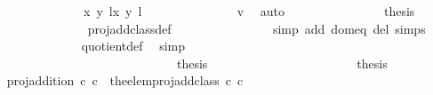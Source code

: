 \begin{isabellebody}
\ \ \ \ \ \ \ \ \ \ \ \ \ \ \ \ {\isacharbraceleft}{\isacharparenleft}{\isacharparenleft}{\isacharparenleft}x{\isacharcomma}\ y{\isacharparenright}{\isacharcomma}\ l{\isacharparenright}{\isacharcomma}{\isacharparenleft}{\isacharparenleft}x{\isacharprime}{\isacharcomma}\ y{\isacharprime}{\isacharparenright}{\isacharcomma}\ l{\isacharprime}{\isacharparenright}{\isacharparenright}{\isacharbraceright}{\isachardoublequoteclose}\ \isanewline
\ \ \ \ \ \ \ \ \ \ \ \ \isamarkupfalse%
\ v{}\ \isamarkupfalse%
\ auto\isanewline
\ \ \ \ \ \ \ \ \ \ \ \ \isamarkupfalse%
\ \isamarkupfalse%
\ {\isacharquery}thesis\ \isanewline
\ \ \ \ \ \ \ \ \ \ \ \ \ \ \isamarkupfalse%
\ {}\ proj{\isacharunderscore}add{\isacharunderscore}class{\isacharunderscore}def\ \isanewline
\ \ \ \ \ \ \ \ \ \ \ \ \ \ \isamarkupfalse%
{\isacharparenleft}simp\ add{\isacharcolon}\ dom{\isacharunderscore}eq\ del{\isacharcolon}\ {\isasymtau}{\isachardot}simps{\isacharparenright}\isanewline
\ \ \ \ \ \ \ \ \ \ \ \ \ \ \isamarkupfalse%
\ quotient{\isacharunderscore}def\ \isamarkupfalse%
\ simp\isanewline
\ \ \ \ \ \ \ \ \ \ \isamarkupfalse%
\isanewline
\ \ \ \ \ \ \ \ \isamarkupfalse%
\isanewline
\ \ \ \ \ \ \isamarkupfalse%
\ \ \ \ \isanewline
\ \ \ \ \ \ \isamarkupfalse%
\ \ \ \ \ \ \ \ \isanewline
\ \ \ \ \isamarkupfalse%
\isanewline
\ \ \ \ \ \ \isamarkupfalse%
\ {}\isanewline
\ \ \ \ \ \ \isamarkupfalse%
\ \isamarkupfalse%
\ {\isacharquery}thesis\ \isamarkupfalse%
\isanewline
\ \ \ \ \isamarkupfalse%
\isanewline
\ \ \ \ \ \ \isamarkupfalse%
\ {}\isanewline
\ \ \ \ \ \ \isamarkupfalse%
\ \isamarkupfalse%
\ {\isacharquery}thesis\ \isamarkupfalse%
\isanewline
\ \ \ \ \isamarkupfalse%
\isanewline
\ \ \isamarkupfalse%
%
\endisatagproof
{\isafoldproof}%
%
\isadelimproof
\isanewline
%
\endisadelimproof
\isanewline
{}\isamarkupfalse%
\ {\isachardoublequoteopen}proj{\isacharunderscore}addition\ c{}\ c{}\ {\isacharequal}\ the{\isacharunderscore}elem{\isacharparenleft}proj{\isacharunderscore}add{\isacharunderscore}class\ c{}\ c{}{\isacharparenright}{\isachardoublequoteclose}\isanewline
\isanewline

\end{isabellebody}
